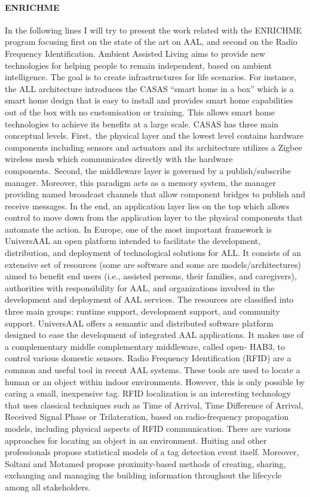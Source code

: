 \paragraph{ENRICHME}
In the following lines I will try to present the work related with the ENRICHME program focusing first on the state of the art on AAL,
and second on the Radio Frequency Identification. Ambient Assisted Living aims to provide new technologies for helping people to remain
independent, based on ambient intelligence. The goal is to create infrastructures for life scenarios. For instance, the ALL architecture
introduces the CASAS “smart home in a box” which is a smart home design that is easy to install and provides smart home capabilities out
of the box with no customisation or training. \cite{cook2013casas} This allows smart home technologies to achieve its benefits at a large scale. CASAS has
three main conceptual levels. First, the physical layer and the lowest level contains hardware components including sensors and actuators
and its architecture utilizes a Zigbee wireless mesh which communicates directly with the hardware components. Second, the middleware layer 
is governed by a publish/subscribe manager. Moreover, this paradigm acts as a memory system, the manager providing named broadcast channels
that allow component bridges to publish and receive messages. In the end, an application layer lies on the top which allows control to move
down from the application layer to the physical components that automate the action. In Europe, one of the most important framework is UniversAAL
an open platform intended to facilitate the development, distribution, and deployment of technological 
solutions for ALL. It consists of an extensive set of resources (some are software and some are models/architectures) aimed to benefit end users
(i.e., assisted persons, their families, and caregivers), authorities with responsibility for AAL, and organizations involved in the development
and deployment of AAL services. The resources are classified into three main groups: runtime support, development support, and community support.
UniversAAL offers a semantic and distributed software platform designed to ease the development of integrated AAL applications. It makes use of
a complementary middle complementary middleware, called open- HAB3, to control various domestic sensors. \cite{ferro2015universaal}
Radio Frequency Identification (RFID) are a common and useful tool in recent AAL systems. These tools are used to locate
a human or an object within indoor environments. However, this is only possible by caring a small, inexpensive tag.
RFID localization is an interesting technology that uses classical techniques such as Time of Arrival, Time Difference 
of Arrival, Received Signal Phase or Trilateration, based on radio-frequency propagation models, including physical aspects of RFID communication. \cite{bouchard2014human} 
There are various approaches for locating an object in an environment. Huiting and other professionals propose statistical models of a tag detection event itself. \cite{huiting2013exploiting} 
Moreover, Soltani and Motamed propose proximity-based methods of creating, sharing, exchanging and managing the building information throughout the lifecycle among
all stakeholders. \cite{soltani2013neighborhood}

